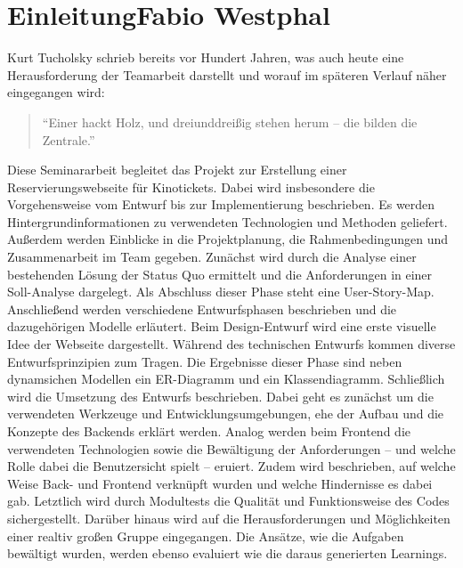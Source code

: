 \chapter[Einleitung]{Einleitung{\hfill \normalsize Fabio Westphal}} 

Kurt Tucholsky schrieb bereits vor Hundert Jahren, was auch heute eine Herausforderung der Teamarbeit darstellt und worauf im späteren Verlauf näher eingegangen wird: 
\vspace*{\fill} 
\begin{quote} 
	\centering 
	\enquote{Einer hackt Holz, und dreiunddreißig stehen herum – die bilden die Zentrale.}
\end{quote}
\vspace*{\fill} 
Diese Seminararbeit begleitet das Projekt zur Erstellung einer Reservierungswebseite für Kinotickets. Dabei wird insbesondere die Vorgehensweise vom Entwurf bis zur Implementierung beschrieben. Es werden Hintergrundinformationen zu verwendeten Technologien und Methoden geliefert. Außerdem werden Einblicke in die Projektplanung, die Rahmenbedingungen und Zusammenarbeit im Team gegeben. \newline
Zunächst wird durch die Analyse einer bestehenden Lösung der Status Quo ermittelt und die Anforderungen in einer Soll-Analyse dargelegt. Als Abschluss dieser Phase steht eine User-Story-Map.
Anschließend werden verschiedene Entwurfsphasen beschrieben und die dazugehörigen Modelle erläutert. Beim Design-Entwurf wird eine erste visuelle Idee der Webseite dargestellt. Während des technischen Entwurfs kommen diverse Entwurfsprinzipien zum Tragen. Die Ergebnisse dieser Phase sind neben dynamsichen Modellen ein ER-Diagramm und ein Klassendiagramm.
Schließlich wird die Umsetzung des Entwurfs beschrieben. Dabei geht es zunächst um die verwendeten Werkzeuge und Entwicklungsumgebungen, ehe der Aufbau und die Konzepte des Backends erklärt werden. Analog werden beim Frontend die verwendeten Technologien sowie die Bewältigung der Anforderungen  -- und welche Rolle dabei die Benutzersicht spielt -- eruiert. Zudem wird beschrieben, auf welche Weise Back- und Frontend verknüpft wurden und welche Hindernisse es dabei gab. Letztlich wird durch Modultests die Qualität und Funktionsweise des Codes sichergestellt.
Darüber hinaus wird auf die Herausforderungen und Möglichkeiten einer realtiv großen Gruppe eingegangen. Die Ansätze, wie die Aufgaben bewältigt wurden, werden ebenso evaluiert wie die daraus generierten Learnings.
